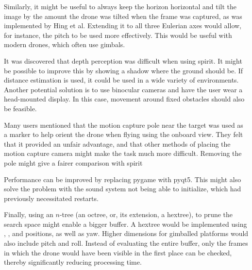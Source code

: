 Similarly, it might be useful to always keep the horizon horizontal and tilt the image by the amount the drone was tilted when the frame was captured, as was implemented by Hing et al.\cite{hing2009}
Extending it to all three Eulerian axes would allow, for instance, the pitch to be used more effectively.
This would be useful with modern drones, which often use gimbals.

It was discovered that depth perception was difficult when using \gls{spirit}.
It might be possible to improve this by showing a shadow where the ground should be.
If distance estimation is used, it could be used in a wide variety of environments.
Another potential solution is to use binocular cameras and have the user wear a head-mounted display.
In this case, movement around fixed obstacles should also be feasible.

Many users mentioned that the motion capture pole near the target was used as a marker to help orient the drone when flying using the onboard view.
They felt that it provided an unfair advantage, and that other methods of placing the motion capture camera might make the task much more difficult.
Removing the pole might give a fairer comparison with \gls{spirit}

Performance can be improved by replacing \gls{pygame} with \gls{pyqt5}.
This might also solve the problem with the sound system not being able to initialize, which had previously necessitated restarts.

Finally, using an $n$-tree (an octree, or, its extension, a hextree), to prune the search space might enable a bigger buffer.
A hextree would be implemented using , , and  positions, as well as yaw.
Higher dimensions for gimballed platforms would also include pitch and roll.
Instead of evaluating the entire buffer, only the frames in which the drone would have been visible in the first place can be checked, thereby significantly reducing processing time.

